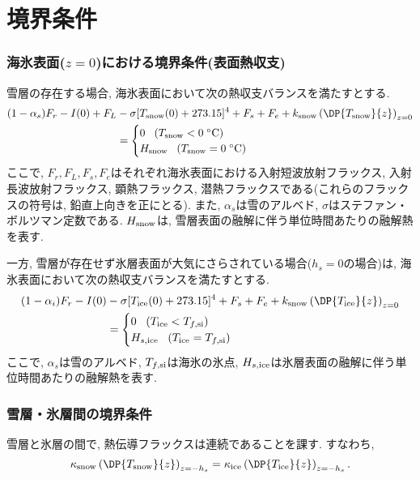 \section{境界条件}

\subsubsection*{海氷表面($z=0$)における境界条件(表面熱収支)}
雪層の存在する場合, 海氷表面において次の熱収支バランスを満たすとする. 
\begin{equation}
 \begin{split}
    (1 - \alpha_s) F_r - I(0) + F_L &- \sigma [T_{\rm snow}(0) + 273.15]^4 + F_s + F_e
    + k_{\rm snow} \left(\DP{T_{\rm snow}}{z}\right)_{z=0} \\
  &= \begin{cases} 
      0 \;\;\; (T_{\rm snow} < 0 \; {\rm ^\circ C}) \\
      H_{\rm snow} \;\;\; (T_{\rm snow} = 0 \; {\rm ^\circ C} )
     \end{cases}
 \end{split}
\end{equation}
ここで, $F_r, F_L, F_s, F_e$はそれぞれ海氷表面における入射短波放射フラックス, 入射長波放射フラックス,
顕熱フラックス, 潜熱フラックスである(これらのフラックスの符号は, 鉛直上向きを正にとる).
また, $\alpha_s$は雪のアルベド, $\sigma$はステファン・ボルツマン定数である. 
$H_{\rm snow}$は, 雪層表面の融解に伴う単位時間あたりの融解熱を表す. 

一方, 雪層が存在せず氷層表面が大気にさらされている場合($h_s=0$の場合)は,
海氷表面において次の熱収支バランスを満たすとする. 
\begin{equation}
 \begin{split}
    (1 - \alpha_i) F_r - I(0) &- \sigma [T_{\rm ice}(0) + 273.15]^4 + F_s + F_e
    + k_{\rm snow} \left(\DP{T_{\rm ice}}{z}\right)_{z=0} \\
  &= \begin{cases} 
      0 \;\;\; (T_{\rm ice} < T_{f,{\rm si}}) \\
      H_{s,{\rm ice}} \;\;\; (T_{\rm ice} = T_{f,{\rm si}} )
     \end{cases}
 \end{split}
\end{equation}
ここで, $\alpha_s$は雪のアルベド, $T_{f,{\rm si}}$は海氷の氷点, 
$H_{s,{\rm ice}}$は氷層表面の融解に伴う単位時間あたりの融解熱を表す. 

\subsubsection*{雪層・氷層間の境界条件}
雪層と氷層の間で, 熱伝導フラックスは連続であることを課す.
すなわち, 
\begin{equation}
   \kappa_{\rm snow} \left(\DP{T_{\rm snow}}{z} \right)_{z=-h_s}
=  \kappa_{\rm ice} \left(\DP{T_{\rm ice}}{z} \right)_{z=-h_s}. 
\end{equation}

